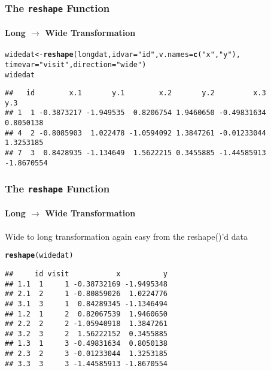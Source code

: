 \documentclass[paper=screen,mathserif]{beamer}\usepackage[]{graphicx}\usepackage[]{color}
\makeatletter
\newcommand{\hlstr}[1]{\textcolor[rgb]{0.192,0.494,0.8}{#1}}%
\newcommand{\hlstd}[1]{\textcolor[rgb]{0.345,0.345,0.345}{#1}}%
\newcommand{\hlkwb}[1]{\textcolor[rgb]{0.69,0.353,0.396}{#1}}%
\newcommand{\hlkwc}[1]{\textcolor[rgb]{0.333,0.667,0.333}{#1}}%
\newcommand{\hlkwd}[1]{\textcolor[rgb]{0.737,0.353,0.396}{\textbf{#1}}}%
\newenvironment{kframe}{%
 \def\at@end@of@kframe{}%
 \ifinner\ifhmode%
  \def\at@end@of@kframe{\end{minipage}}%
  \begin{minipage}{\columnwidth}%
 \fi\fi%
 \def\FrameCommand##1{\hskip\@totalleftmargin \hskip-\fboxsep
 \colorbox{shadecolor}{##1}\hskip-\fboxsep
     \hskip-\linewidth \hskip-\@totalleftmargin \hskip\columnwidth}%
 \MakeFramed {\advance\hsize-\width
   \@totalleftmargin\z@ \linewidth\hsize
   \@setminipage}}%
 {\par\unskip\endMakeFramed%
 \at@end@of@kframe}
\newenvironment{knitrout}{}{} %
\newcommand{\ft}[1]{\frametitle{#1}}
\newcommand{\fst}[1]{\framesubtitle{#1}}
\makeatother
\begin{document}
\begin{frame}[fragile]
  \ft{The {\tt reshape} Function}
  \fst{Long $\rightarrow$ Wide Transformation}
  
\begin{knitrout}\scriptsize
{}\color{fgcolor}\begin{kframe}
\begin{alltt}
\hlstd{widedat} \hlkwb{<-} \hlkwd{reshape}\hlstd{(longdat,} \hlkwc{idvar} \hlstd{=} \hlstr{"id"}\hlstd{,} \hlkwc{v.names} \hlstd{=} \hlkwd{c}\hlstd{(}\hlstr{"x"}\hlstd{,} \hlstr{"y"}\hlstd{),}
                   \hlkwc{timevar} \hlstd{=} \hlstr{"visit"}\hlstd{,} \hlkwc{direction} \hlstd{=} \hlstr{"wide"}\hlstd{)}
\hlstd{widedat}
\end{alltt}
\begin{verbatim}
##   id        x.1       y.1        x.2       y.2         x.3        y.3
## 1  1 -0.3873217 -1.949535  0.8206754 1.9460650 -0.49831634  0.8050138
## 4  2 -0.8085903  1.022478 -1.0594092 1.3847261 -0.01233044  1.3253185
## 7  3  0.8428935 -1.134649  1.5622215 0.3455885 -1.44585913 -1.8670554
\end{verbatim}
\end{kframe}
\end{knitrout}
\end{frame}

\begin{frame}[fragile]
  \ft{The {\tt reshape} Function}
  \fst{Long $\rightarrow$ Wide Transformation}

  Wide to long transformation again easy from the reshape()'d data
\begin{knitrout}\scriptsize
{}\color{fgcolor}\begin{kframe}
\begin{alltt}
\hlkwd{reshape}\hlstd{(widedat)}
\end{alltt}
\begin{verbatim}
##     id visit           x          y
## 1.1  1     1 -0.38732169 -1.9495348
## 2.1  2     1 -0.80859026  1.0224776
## 3.1  3     1  0.84289345 -1.1346494
## 1.2  1     2  0.82067539  1.9460650
## 2.2  2     2 -1.05940918  1.3847261
## 3.2  3     2  1.56222152  0.3455885
## 1.3  1     3 -0.49831634  0.8050138
## 2.3  2     3 -0.01233044  1.3253185
## 3.3  3     3 -1.44585913 -1.8670554
\end{verbatim}
\end{kframe}
\end{knitrout}

\end{frame}
\end{document}
